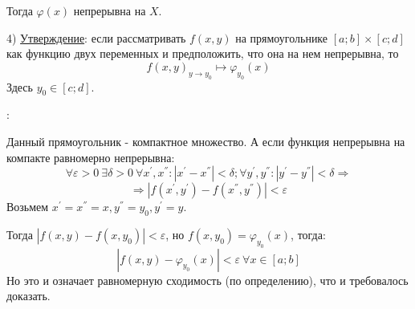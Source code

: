 \documentclass[12pt]{article}
\begin{document}
Тогда $\varphi(x)$ непрерывна на $X$.\par
4) \uline{Утверждение}: если рассматривать $f(x,y)$ на прямоугольнике $[a;b] \times [c;d]$ как функцию двух переменных и предположить, что она на нем непрерывна, то
$$f(x,y)_{y \to y_0} \mapsto \varphi_{y_0}(x)$$
Здесь $y_0 \in [c;d]$.\par
{}:\par
Данный прямоугольник - компактное множество. А если функция непрерывна на компакте равномерно непрерывна:
$$\forall \varepsilon > 0 \ \exists \delta > 0 \ \forall x^{'}, x^{''}:|x^{'} - x^{''}| < \delta; \forall y^{'}, y^{''}:|y^{'} - y^{''}| < \delta \Rightarrow$$
$$\Rightarrow |f(x^{'}, y^{'})-f(x^{''},y^{''})|<\varepsilon$$
Возьмем $x^{'} = x^{''} = x, y^{''} = y_0, y^{'} = y$.\par
Тогда $|f(x,y)-f(x,y_0)|<\varepsilon$, но $f(x,y_0) = \varphi_{y_0}(x)$, тогда:
$$|f(x,y)-\varphi_{y_0}(x)| < \varepsilon \ \forall x \in [a;b]$$
Но это и означает равномерную сходимость (по определению), что и требовалось доказать.\par
\end{document}
